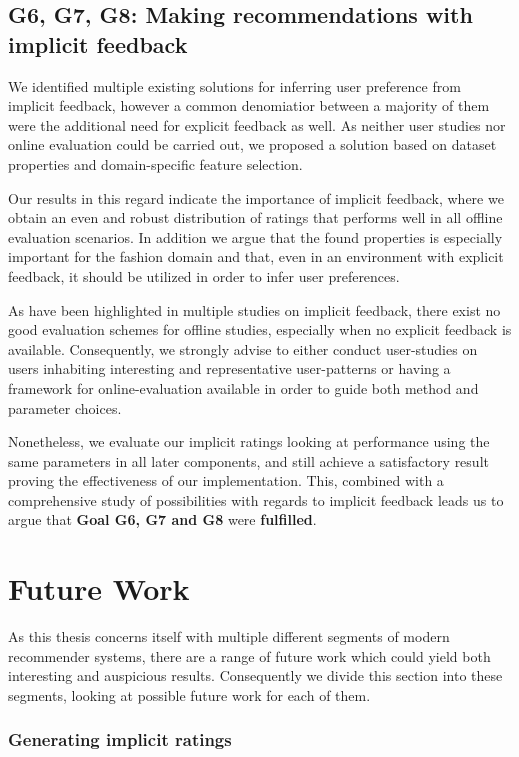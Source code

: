 \subsection{G6, G7, G8: Making recommendations with implicit feedback}
\label{sec:implicit-discussion}

We identified multiple existing solutions for inferring user preference from
implicit feedback, however a common denomiatior between a majority of them were
the additional need for explicit feedback as well. As neither user studies nor
online evaluation could be carried out, we proposed a solution based on dataset
properties and domain-specific feature selection.

Our results in this regard indicate the importance of implicit feedback, where
we obtain an even and robust distribution of ratings that performs well in all
offline evaluation scenarios. In addition we argue that the found properties is
especially important for the fashion domain and that, even in an environment
with explicit feedback, it should be utilized in order to infer user
preferences.

As have been highlighted in multiple studies on implicit feedback, there exist
no good evaluation schemes for offline studies, especially when no explicit
feedback is available. Consequently, we strongly advise to either conduct
user-studies on users inhabiting interesting and representative user-patterns
or having a framework for online-evaluation available in order to guide both
method and parameter choices.

Nonetheless, we evaluate our implicit ratings looking at performance using the
same parameters in all later components, and still achieve a satisfactory
result proving the effectiveness of our implementation. This, combined with a
comprehensive study of possibilities with regards to implicit feedback leads us
to argue that \textbf{Goal G6, G7 and G8} were \textbf{fulfilled}.

\section{Future Work}

As this thesis concerns itself with multiple different segments of modern
recommender systems, there are a range of future work which could yield
both interesting and auspicious results. Consequently we divide this section
into these segments, looking at possible future work for each of them.

\subsubsection{Generating implicit ratings}

